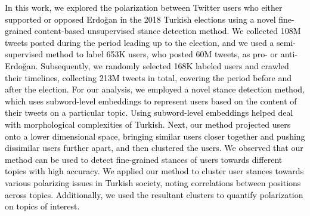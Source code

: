 \documentclass[letterpaper]{article} \usepackage{aaai20}  \usepackage{times}  \usepackage{stackengine}
\newcommand{\kareem}{\textcolor{black}}
\begin{document}
\kareem{In this work, we explored the polarization between Twitter users who either supported or opposed Erdo\u{g}an in the 2018 Turkish elections using a novel fine-grained content-based unsupervised stance detection method. We collected 108M tweets posted during the period leading up to the election, and we used a semi-supervised method to label 653K users, who posted 60M tweets, as pro- or anti-Erdo\u{g}an. Subsequently, we randomly selected 168K labeled users and crawled their timelines, collecting 213M tweets in total, covering the period before and after the election. For our analysis, we employed a novel stance detection method, which uses subword-level  embeddings to represent users based on the content of their tweets on a particular topic. Using subword-level embeddings helped deal with morphological complexities of Turkish. Next, our method projected users onto a lower dimensional space, bringing similar users closer together and pushing dissimilar users further apart, and then clustered the users. We observed that our method can be used to detect fine-grained stances of users towards different topics with high accuracy. We applied our method to cluster user stances towards various polarizing issues in Turkish society, noting correlations between positions across topics. Additionally, we used the resultant clusters to quantify polarization on topics of interest.  
}




\end{document}
